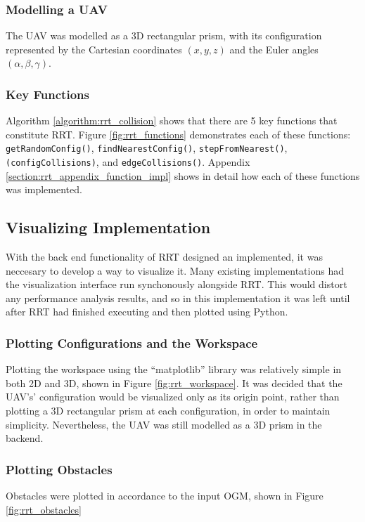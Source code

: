     \subsubsection{Modelling a \gls{UAV}}
        The \gls{UAV} was modelled as a \gls{3D} rectangular prism, with its configuration represented by the Cartesian coordinates $(x,y,z)$ and the Euler angles $(\alpha, \beta, \gamma)$.

    \subsubsection{Key Functions}
        Algorithm \ref{algorithm:rrt_collision} shows that there are 5 key functions that constitute \gls{RRT}. Figure \ref{fig:rrt_functions} demonstrates each of these functions: \texttt{getRandomConfig()}, \texttt{findNearestConfig()}, \texttt{stepFromNearest()}, \texttt{(configCollisions)}, and \texttt{edgeCollisions()}. Appendix \ref{section:rrt_appendix_function_impl} shows in detail how each of these functions was implemented.
        

\newpage
\subsection{Visualizing Implementation}
    With the back end functionality of \gls{RRT} designed an implemented, it was neccesary to develop a way to visualize it. Many existing implementations had the visualization interface run synchonously alongside \gls{RRT}. This would distort any performance analysis results, and so in this implementation it was left until after \gls{RRT} had finished executing and then plotted using Python.

    \subsubsection{Plotting Configurations and the Workspace}
        Plotting the workspace using the ``matplotlib'' library was relatively simple in both \gls{2D} and \gls{3D}, shown in Figure \ref{fig:rrt_workspace}. It was decided that the \gls{UAV}'s' configuration would be visualized only as its origin point, rather than plotting a \gls{3D} rectangular prism at each configuration, in order to maintain simplicity. Nevertheless, the \gls{UAV} was still modelled as a 3D prism in the backend.
        

    \subsubsection{Plotting Obstacles}
        Obstacles were plotted in accordance to the input \gls{OGM}, shown in Figure \ref{fig:rrt_obstacles}

